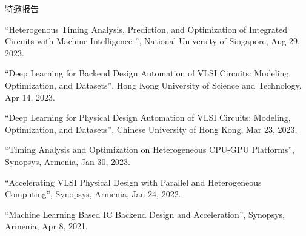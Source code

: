 \begin{rSection}{特邀报告}
\begin{description}[font=\normalfont]
\item[{[T6]}]{
``Heterogenous Timing Analysis, Prediction, and Optimization of Integrated Circuits with Machine Intelligence '', National University of Singapore, Aug 29, 2023. 
}

\item[{[T5]}]{
``Deep Learning for Backend Design Automation of VLSI Circuits: Modeling, Optimization, and Datasets'', Hong Kong University of Science and Technology, Apr 14, 2023. 
}

\item[{[T4]}]{
``Deep Learning for Physical Design Automation of VLSI Circuits: Modeling, Optimization, and Datasets'', Chinese University of Hong Kong, Mar 23, 2023. 
}

\item[{[T3]}]{
``Timing Analysis and Optimization on Heterogeneous CPU-GPU Platforms'', Synopsys, Armenia, Jan 30, 2023. 
}

\item[{[T2]}]{
``Accelerating VLSI Physical Design with Parallel and Heterogeneous Computing'', Synopsys, Armenia, Jan 24, 2022. 
}

\item[{[T1]}]{
``Machine Learning Based IC Backend Design and Acceleration'', Synopsys, Armenia, Apr 8, 2021. 
}

\end{description}

\end{rSection}
